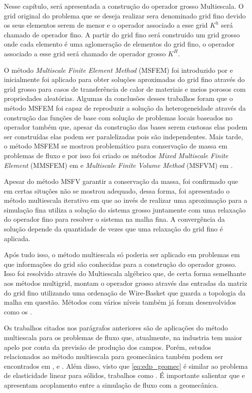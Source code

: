 
Nesse capítulo, será apresentada a construção do operador grosso Multiescala. O grid original do problema que se deseja realizar sera denominado grid fino devido os seus elementos serem de menor e o operador associado a esse grid $K^h$ será chamado de operador fino. A partir do grid fino será construido um grid grosso onde cada elemento é uma aglomeração de elementos do grid fino, o operador associado a esse grid será chamado de operador grosso $K^H$.


O método \textit{Multiscale Finite Element Method} (MSFEM) foi introduzido por \citet{thomashou} e inicialmente foi aplicado para obter soluções aproximadas do grid fino através do grid grosso para casos de transferência de calor de materiais e meios porosos com propriedades aleatórias. Algumas da conclusões desses trabalhos foram que o método MSFEM foi capaz de reproduzir a solução da heterogeneidade através da construção das funções de base com solução de problemas locais baseados no operador também que, apesar da construção das bases serem custosas elas podem ser construídas elas podem ser paralelizadas pois são independentes.  Mais tarde, o método MSFEM se mostrou problemático para conservação de massa em problemas de fluxo e por isso foi criado os métodos \textit{Mixed Multiscale Finite Element} (MMSFEM) em \citet{mixedmsfem} e  \textit{Multiscale Finite Volume Method} (MSFVM) em \citet{msfv}.

Apesar do método MSFV garantir a conservação da massa, foi confirmado que em certas situções não se mostrou adequado, dessa forma, foi apresentado o método multiescala iterativo em \citet{iterativems} que ao invés de realizar uma aproximação para a simulação fina utiliza a solução do sistema grosso juntamente com uma relaxação do operador fino para resolver o sistema na malha fina. A convergência da solução depende da quantidade de vezes que uma relaxação do grid fino é aplicada.

Após tudo isso, o método multiescala só poderia ser aplicado em problemas em que informações do grid são conhecidas para a construção do operador grosso. Isso foi resolvido através do Multiescala algébrico que, de certa forma semelhante aos métodos multigrid, montam o operador grosso através das entradas da matriz do grid fino utilizando uma ordenação de Wire-Basket que guarda a topologia da malha em questão. Métodos com vários níveis também já foram desenvolvidos como os \citet{multilevel}.



Os trabalhos citados nos parágrafos anteriores são de aplicações do método multiescala para os problemas de fluxo que, atualmente, na industria tem maior apelo por conta da previsão de produção dos campos. Porém, estudos relacionados ao método multiescala para geomecânica também podem ser encontrados em \citet{casteletto}, \citet{irina} e \citet{castelettoacoplado}. Além disso, visto que \eqref{eq:edp_geomec} é similar ao problema de elasticidade linear para sólidos, trabalhos como \citet{mbuck}. É importante salientar que \cite{casteletto} e \cite{irina} apresentam acoplamento entre a simulação de fluxo com a geomecânica.

